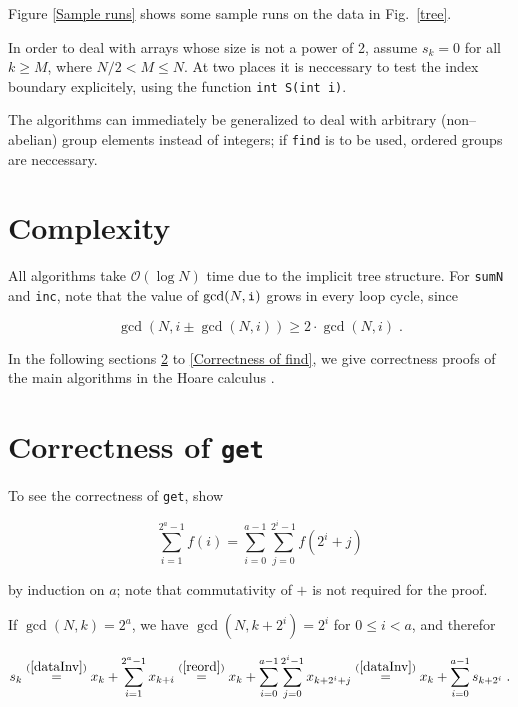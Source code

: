 \documentclass{elsartNoFoot}
\newcommand{\1}{\color{red}}
\newcommand{\2}{\color{green}}
\renewcommand{\leq}{\leqslant}		\renewcommand{\geq}{\geqslant}
\newcommand{\X}[1]{x_{#1}}		\renewcommand{\S}[1]{s_{#1}}
\newcommand{\+}[3]{{\renewcommand{\i}{{#1}}{#3},\ldots,\renewcommand{\i}{{#2}}{#3}}}
\newcommand{\ti}{{\tt i}}		\newcommand{\tk}{{\tt k}}
\renewcommand{\exp}[1]{\gcd(N,#1)}
\newcommand{\rf}[2]{\stackrel{(\ref{#1})}{#2}}
\begin{document}
Figure \ref{Sample runs} shows some sample runs on the data in
Fig.~\ref{tree}.


In order to deal with arrays whose size is not a
power of 2, assume $\S{k} = 0$ for all $k \geq M$, where
$N/2 < M \leq N$. At two places it is neccessary to test
the index boundary explicitely, using the function {\tt int S(int i)}.

The algorithms can immediately be generalized to deal with arbitrary
(non--abelian) group elements instead of integers; if {\tt find} is to
be used, ordered groups are neccessary.








\section{Complexity}
\label{Complexity}


All algorithms take ${\mathcal O}(\log N)$ time due to the implicit tree
structure.
For {\tt sumN} and {\tt inc}, note that the value of $\exp{\ti}$
grows in every loop cycle, since

\begin{equation}
	\exp{i \pm \exp{i}} \geq 2 \cdot \exp{i} \; .
	\label{expIncr}
\end{equation}

In the following sections \ref{Correctness of get} to
\ref{Correctness of find}, we give correctness proofs of the main
algorithms in the Hoare calculus \cite{Hoare.1969}.






\section{Correctness of {\tt get}}
\label{Correctness of get}

To see the correctness of {\tt get}, show

\begin{equation}
	\sum_{i=1}^{2^a-1} f(i)
	= \sum_{i=0}^{a-1} \sum_{j=0}^{2^i-1} f(2^i+j)	
	\label{reord}
\end{equation}

by induction on $a$;
note that commutativity of $+$ is not required for the proof.

If $\exp{k} = 2^a$, we have $\exp{k+2^i} = 2^i$ for $0 \leq i < a$,
and therefor 

\begin{equation}
\S{k} 
\rf{dataInv}= \X{k} + \sum_{i=1}^{2^a-1} \X{k+i}
\rf{reord}= \X{k} + \sum_{i=0}^{a-1} \sum_{j=0}^{2^i-1} \X{k+2^i+j}
\rf{dataInv}= \X{k} + \sum_{i=0}^{a-1} \S{k + 2^i} \; .
\label{recurs}
\end{equation}
\end{document}
